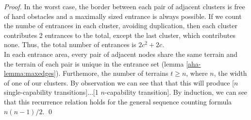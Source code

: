 \begin{proof}
In the worst case, the border between each pair of adjacent clusters is free of hard obstacles and a maximally sized entrance is always possible. If we count the numbe of entrances in each cluster, avoiding duplication, then each cluster contributes 2 entrances to the total, except the last cluster, which contributes none. Thus, the total number of entrances is $2c^2 + 2c$. \\
In each entrance area, every pair of adjacent nodes share the same terrain and the terrain of each pair is unique in the entrance set (lemma \ref{aha-lemma:maxedges}).
Furthemore, the number of terrains $t \geq n$, where $n$, the width of one of our clusters. By observation we can see that that this will produce [$n$ single-capability transitions]...[1 $n$-capability transition]. By induction, we can see that this recurrence relation holds for the general sequence counting formula $n(n-1)/2$. \qed
\end{proof}

